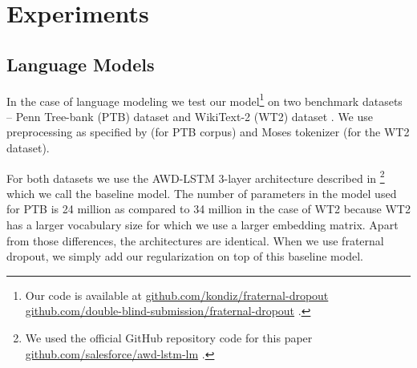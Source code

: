 \documentclass{article} %
\begin{document}
\section{Experiments}

\subsection{Language Models} \label{subsec:elm}
In the case of language modeling we test our model\footnote{Our code is available at 
\ificlrfinal
\url{github.com/kondiz/fraternal-dropout}
\else
\url{github.com/double-blind-submission/fraternal-dropout}
\fi
.} on two benchmark datasets -- Penn Tree-bank (PTB) dataset \citep{marcus1993building} and WikiText-2 (WT2) dataset \citep{DBLP:journals/corr/MerityXBS16}. We use preprocessing as specified by \citet{mikolov2010recurrent} (for PTB corpus) and Moses tokenizer \citet{koehn2007moses} (for the WT2 dataset).

For both datasets we use the AWD-LSTM 3-layer architecture described in \citet{merity2017regularizing}\footnote{We used the official GitHub repository code for this paper \url{github.com/salesforce/awd-lstm-lm} .} which we call the baseline model. The number of parameters in the model used for PTB is 24 million as compared to 34 million in the case of WT2 because WT2 has a larger vocabulary size for which we use a larger embedding matrix. Apart from those differences, the architectures are identical. When we use fraternal dropout, we simply add our regularization on top of this baseline model.
\end{document}
